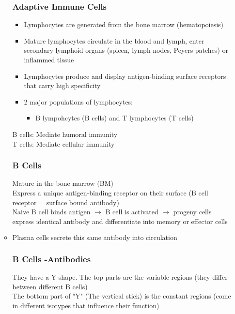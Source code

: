 \begin{itemize}
\begin{itemize}
\subsubsection{Adaptive Immune Cells}
\begin{itemize}
    \item Lymphocytes are generated from the bone marrow (hematopoiesis)
    \item Mature lymphocytes circulate in the blood and lymph, enter secondary lymphoid organs (spleen, lymph nodes, Peyers patches) or inflammed tissue
    \item Lymphocytes produce and display antigen-binding surface receptors that carry high specificity
    \item 2 major populations of lymphocytes:
    \begin{itemize}
        \item B lympohcytes (B cells) and T lymphocytes (T cells)
    \end{itemize}
\end{itemize}
B cells: Mediate humoral immunity
\\T cells: Mediate cellular immunity

\subsubsection{B Cells}
Mature in the bone marrow (BM)
\\Express a unique antigen-binding receptor on their surface (B cell receptor = surface bound antibody)
\\Naive B cell binds antigen $\rightarrow$ B cell is activated $\rightarrow$ progeny cells express identical antibody and differentiate into memory or effector cells
\item Plasma cells secrete this same antibody into circulation

\subsubsection{B Cells -Antibodies}
They have a Y shape. The top parts are the variable regions (they differ between different B cells)
\\The bottom part of "Y" (The vertical stick) is the constant regions (come in different isotypes that influence their function)


\end{itemize}
\end{itemize}
